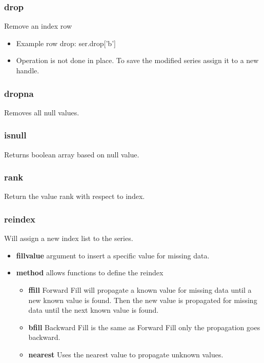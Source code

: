 %
\subsubsection{drop}
Remove an index row
  \begin{itemize}

    \item Example row drop: ser.drop['b']

    \item Operation is not done in place.  To save the modified series
      assign it to a new handle.
  \end{itemize}

%
\subsubsection{dropna}
Removes all null values.

%
\subsubsection{isnull}
Returns boolean array based on null value.

%
\subsubsection{rank}
Return the value rank with respect to index.

%
\subsubsection{reindex}
Will assign a new index list to the series.
  \begin{itemize}

    \item \textbf{fill\textunderscore value} argument to insert a specific
      value for missing data.

    \item \textbf{method} allows functions to define the reindex
      \begin{itemize}

        \item \textbf{ffill} Forward Fill will propagate a known value for
          missing data until a new known value is found.  Then the new value
          is propagated for missing data until the next known value is found.

        \item \textbf{bfill} Backward Fill is the same as Forward Fill only
          the propagation goes backward.

        \item \textbf{nearest} Uses the nearest value to propagate unknown
          values.
      \end{itemize}
  \end{itemize}

